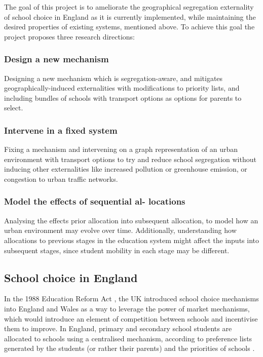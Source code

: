 \documentclass{article}
\begin{document}
\begin{multicols}{2}
The goal of this project is to ameliorate the geographical segregation externality of school choice in England as it is currently implemented, while maintaining the desired properties of existing systems, mentioned above. To achieve this goal the project proposes three research directions:
\subsubsection{Design a new mechanism}
Designing a new mechanism which is segregation-aware, and mitigates geographically-induced externalities with modifications to priority lists, and including bundles of schools with transport options as options for parents to select.
\subsubsection{Intervene in a fixed system}
Fixing a mechanism and intervening on a graph representation of an urban environment with transport options to try and reduce school segregation without inducing other externalities like increased pollution or greenhouse emission, or congestion to urban traffic networks.
\subsubsection{Model the effects of sequential al-
locations}
Analysing the effects prior allocation into subsequent allocation, to model how an urban environment may evolve over time. Additionally, understanding how allocations to previous stages in the education system might affect the inputs into subsequent stages, since student mobility in each stage may be different.

\subsection{School choice in England}
In the 1988 Education Reform Act \cite{participationEducationReformAct}, the UK introduced school choice mechanisms into England and Wales as a way to leverage the power of market mechanisms, which would introduce an element of competition between schools and incentivise them to improve. In England, primary and secondary school students are allocated to schools using a centralised mechanism, according to preference lists generated by the students (or rather their parents) and the priorities of schools \cite{westSchoolChoiceDiversity2023}.


\end{multicols}
\end{document}
